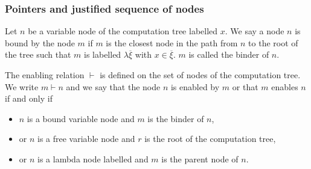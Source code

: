 \subsubsection{Pointers and justified sequence of nodes}

\begin{dfn}[Binder]
Let $n$ be a variable node of the computation tree labelled $x$. We
say a node $n$ is bound by the node $m$ if $m$ is the closest node
in the path from $n$ to the root of the tree such that $m$ is
labelled $\lambda \overline{\xi}$ with $x\in \overline{\xi}$. $m$ is
called the binder of $n$.
\end{dfn}

\begin{dfn}[Enabling]
The enabling relation $\vdash$ is defined on the set of nodes of the
computation tree. We write $m \vdash n$ and we say that the node $n$
is enabled by $m$ or that $m$ enables $n$ if and only if
\begin{itemize}
\item $n$ is a bound variable node and $m$ is the binder of $n$,
\item or $n$ is a free variable node and $r$ is the root of the computation tree,
\item or $n$ is a lambda node labelled and $m$ is the parent node of $n$.
\end{itemize}
\end{dfn}



